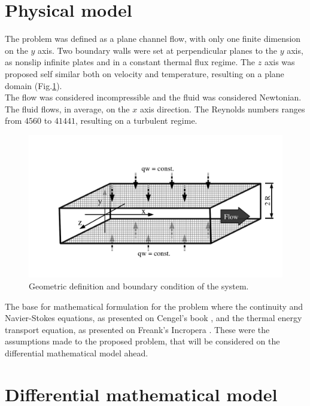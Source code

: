 \documentclass[10pt]{article} %
\begin{document}
\section{Physical model}

The problem was defined as a plane channel flow, with only one finite dimension on the $y$ axis. Two boundary walls were set at perpendicular planes to the $y$ axis, as nonslip infinite plates and in a constant thermal flux regime. The $z$ axis was proposed self similar both on velocity and temperature, resulting on a plane domain (Fig.\ref{figure.1}). \\
The flow was considered incompressible and the fluid was considered Newtonian. The fluid flows, in average, on the $x$ axis direction. 
The Reynolds numbers ranges from $4560$ to $41441$, resulting on a turbulent regime. 

\begin{figure}[h!]
	\centering
	\includegraphics[angle=0, trim={0mm 10mm 0mm 20mm}, clip , scale=0.40]{fotos_formatacao_final/canal1}
	\caption{Geometric definition and boundary condition of the system.}
	\label{figure.1}
\end{figure}

The base for mathematical formulation for the problem where the continuity and Navier-Stokes equations, as presented on Cengel's book \cite{Cengel}, and the thermal energy transport equation, as presented on Freank's Incropera \cite{Incropera}. These were the assumptions made to the proposed problem, that will be considered on the differential mathematical model ahead.





\section{Differential mathematical model}
\end{document}
